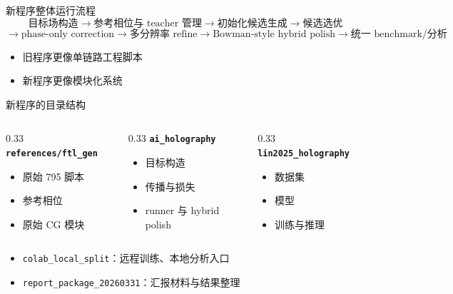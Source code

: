 \documentclass[aspectratio=169,10pt]{ctexbeamer}
\begin{document}
\begin{frame}{新程序整体运行流程}
  \[
  \text{目标场构造}
  \rightarrow
  \text{参考相位与 teacher 管理}
  \rightarrow
  \text{初始化候选生成}
  \rightarrow
  \text{候选选优}
  \]
  \[
  \rightarrow
  \text{phase-only correction}
  \rightarrow
  \text{多分辨率 refine}
  \rightarrow
  \text{Bowman-style hybrid polish}
  \rightarrow
  \text{统一 benchmark/分析}
  \]

  \vspace{0.4em}
  \begin{itemize}
    \item 旧程序更像单链路工程脚本
    \item 新程序更像模块化系统
  \end{itemize}
\end{frame}

\begin{frame}{新程序的目录结构}
  \begin{columns}[T]
    \begin{column}{0.33\textwidth}
      \textbf{\texttt{references/ftl\_gen}}
      \begin{itemize}
        \item 原始 795 脚本
        \item 参考相位
        \item 原始 CG 模块
      \end{itemize}
    \end{column}
    \begin{column}{0.33\textwidth}
      \textbf{\texttt{ai\_holography}}
      \begin{itemize}
        \item 目标构造
        \item 传播与损失
        \item runner 与 hybrid polish
      \end{itemize}
    \end{column}
    \begin{column}{0.33\textwidth}
      \textbf{\texttt{lin2025\_holography}}
      \begin{itemize}
        \item 数据集
        \item 模型
        \item 训练与推理
      \end{itemize}
    \end{column}
  \end{columns}

  \vspace{0.5em}
  \begin{itemize}
    \item \texttt{colab\_local\_split}：远程训练、本地分析入口
    \item \texttt{report\_package\_20260331}：汇报材料与结果整理
  \end{itemize}
\end{frame}
\end{document}
